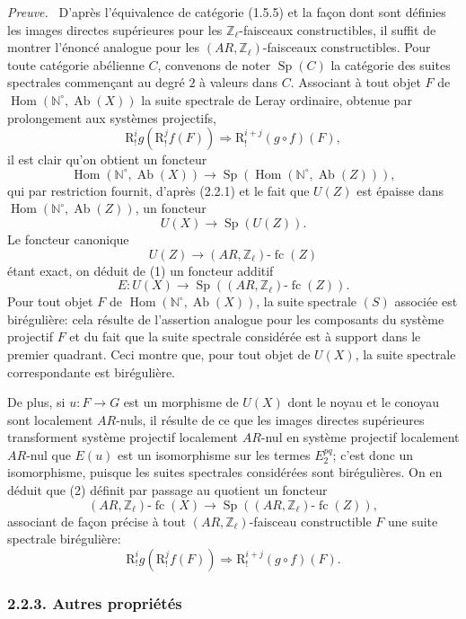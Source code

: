 \documentclass[11pt]{article}
\newenvironment{prooftext}[1][Proof]{\par\noindent\emph{#1.}\ }{\par\medskip}
\DeclareMathOperator{\Hom}{Hom}
\newcommand{\R}{\mathrm{R}}\newcommand{\RHomCore}{\mathrm{RHom}}
\providecommand{\Hom}{\operatorname{Hom}}
\providecommand{\Sp}{\operatorname{Sp}}
\providecommand{\Ab}{\operatorname{Ab}}
\providecommand{\fc}{\operatorname{fc}}
\providecommand{\R}{\mathrm R}
\providecommand{\Ab}{\operatorname{Ab}}
\providecommand{\Hom}{\operatorname{Hom}}
\begin{document}
\begin{prooftext}[Preuve]
D'après l'équivalence de catégorie (1.5.5) et la façon dont sont définies les images directes supérieures pour les \(\mathbb Z_\ell\)-faisceaux constructibles, il suffit de montrer l'énoncé analogue pour les \((AR,\mathbb Z_\ell)\)-faisceaux constructibles. Pour toute catégorie abélienne \(C\), convenons de noter \(\Sp(C)\) la catégorie des suites spectrales commençant au degré \(2\) à valeurs dans \(C\). Associant à tout objet \(F\) de \(\Hom(\mathbb N^\circ,\Ab(X))\) la suite spectrale de Leray ordinaire, obtenue par prolongement aux systèmes projectifs,
\[
\R^i_! g(\R^j_! f(F))\Longrightarrow \R^{i+j}_!(g\circ f)(F),
\tag{S}
\]
il est clair qu'on obtient un foncteur
\[
\Hom(\mathbb N^\circ,\Ab(X))\longrightarrow \Sp(\Hom(\mathbb N^\circ,\Ab(Z))),
\]
qui par restriction fournit, d'après (2.2.1) et le fait que \(U(Z)\) est épaisse dans \(\Hom(\mathbb N^\circ,\Ab(Z))\), un foncteur
\[
U(X)\longrightarrow \Sp(U(Z)).
\tag{1}
\]
Le foncteur canonique
\[
U(Z)\longrightarrow (AR,\mathbb Z_\ell)\text{-}\fc(Z)
\]
étant exact, on déduit de (1) un foncteur additif
\[
E:U(X)\longrightarrow \Sp((AR,\mathbb Z_\ell)\text{-}\fc(Z)).
\tag{2}
\]
Pour tout objet \(F\) de \(\Hom(\mathbb N^\circ,\Ab(X))\), la suite spectrale \((S)\) associée est birégulière: cela résulte de l'assertion analogue pour les composants du système projectif \(F\) et du fait que la suite spectrale considérée est à support dans le premier quadrant. Ceci montre que, pour tout objet de \(U(X)\), la suite spectrale correspondante est birégulière.

De plus, si \(u:F\to G\) est un morphisme de \(U(X)\) dont le noyau et le conoyau sont localement \(AR\)-nuls, il résulte de ce que les images directes supérieures transforment système projectif localement \(AR\)-nul en système projectif localement \(AR\)-nul que \(E(u)\) est un isomorphisme sur les termes \(E_2^{pq}\); c'est donc un isomorphisme, puisque les suites spectrales considérées sont birégulières. On en déduit que (2) définit par passage au quotient un foncteur
\[
(AR,\mathbb Z_\ell)\text{-}\fc(X)
\longrightarrow \Sp((AR,\mathbb Z_\ell)\text{-}\fc(Z)),
\tag{3}
\]
associant de façon précise à tout \((AR,\mathbb Z_\ell)\)-faisceau constructible \(F\) une suite spectrale birégulière:
\[
\R^i_!g(\R^j_!f(F))\Longrightarrow \R^{i+j}_!(g\circ f)(F).
\]
\end{prooftext}

\subsubsection*{2.2.3. Autres propriétés}
\end{document}
